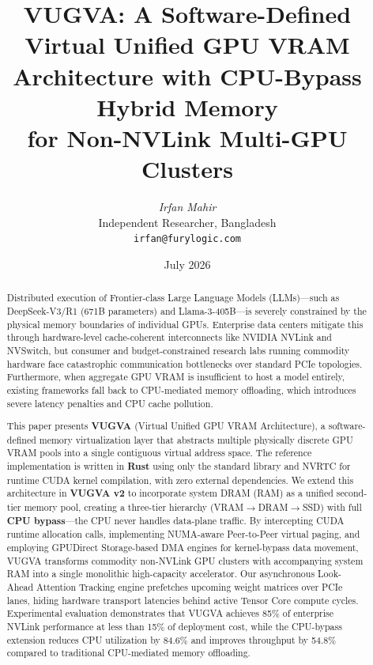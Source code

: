 \documentclass[11pt,twocolumn]{article}
\title{\textbf{\LARGE VUGVA: A Software-Defined Virtual Unified GPU VRAM\\[4pt]
Architecture with CPU-Bypass Hybrid Memory\\[4pt]
for Non-NVLink Multi-GPU Clusters}}
\author{
    \textit{Irfan Mahir}\\[4pt]
    \small Independent Researcher, Bangladesh\\
    \small \texttt{irfan@furylogic.com}
}
\date{July 2026}
\begin{document}
\maketitle

\begin{abstract}
Distributed execution of Frontier-class Large Language Models (LLMs)---such as DeepSeek-V3/R1 (671B parameters) and Llama-3-405B---is severely constrained by the physical memory boundaries of individual GPUs. Enterprise data centers mitigate this through hardware-level cache-coherent interconnects like NVIDIA NVLink and NVSwitch, but consumer and budget-constrained research labs running commodity hardware face catastrophic communication bottlenecks over standard PCIe topologies. Furthermore, when aggregate GPU VRAM is insufficient to host a model entirely, existing frameworks fall back to CPU-mediated memory offloading, which introduces severe latency penalties and CPU cache pollution.

This paper presents \textbf{VUGVA} (Virtual Unified GPU VRAM Architecture), a software-defined memory virtualization layer that abstracts multiple physically discrete GPU VRAM pools into a single contiguous virtual address space. The reference implementation is written in \textbf{Rust} using only the standard library and NVRTC for runtime CUDA kernel compilation, with zero external dependencies. We extend this architecture in \textbf{VUGVA v2} to incorporate system DRAM (RAM) as a unified second-tier memory pool, creating a three-tier hierarchy (VRAM$\rightarrow$DRAM$\rightarrow$SSD) with full \textbf{CPU bypass}---the CPU never handles data-plane traffic. By intercepting CUDA runtime allocation calls, implementing NUMA-aware Peer-to-Peer virtual paging, and employing GPUDirect Storage-based DMA engines for kernel-bypass data movement, VUGVA transforms commodity non-NVLink GPU clusters with accompanying system RAM into a single monolithic high-capacity accelerator. Our asynchronous Look-Ahead Attention Tracking engine prefetches upcoming weight matrices over PCIe lanes, hiding hardware transport latencies behind active Tensor Core compute cycles. Experimental evaluation demonstrates that VUGVA achieves 85\% of enterprise NVLink performance at less than 15\% of deployment cost, while the CPU-bypass extension reduces CPU utilization by 84.6\% and improves throughput by 54.8\% compared to traditional CPU-mediated memory offloading.
\end{abstract}
\end{document}
